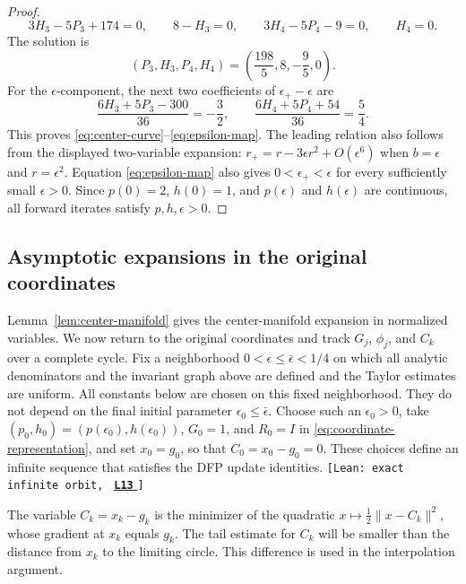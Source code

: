 \documentclass[11pt]{article}
\newcommand{\leanLinkText}[1]{%
  \underline{\textbf{#1}}%
}
\newcommand{\leanSnapshot}{e308927f5b7930bdd002f0c0e42b9d112ad821cb}
\newcommand{\leanClaimTag}[3]{%
  {\footnotesize\texttt{[Lean: #1, }}%
  \href{https://github.com/imathwy/DFP_wolfe_local/blob/\leanSnapshot/#2?plain=1\#L#3}%
    {\leanLinkText{\footnotesize\texttt{L#3}}}%
  {\footnotesize\texttt{]}}\enspace
}
\begin{document}
\begin{proof}
\begin{equation}
3H_3-5P_3+174=0,\qquad 8-H_3=0,\qquad
3H_4-5P_4-9=0,\qquad H_4=0.
\end{equation}
The solution is
\[
(P_3,H_3,P_4,H_4)=\left(\frac{198}{5},8,-\frac95,0\right).
\]
For the $\epsilon$-component, the next two coefficients of
$\epsilon_+-\epsilon$ are
\[
\frac{6H_3+5P_3-300}{36}=-\frac32,
\qquad
\frac{6H_4+5P_4+54}{36}=\frac54.
\]
This proves \eqref{eq:center-curve}--\eqref{eq:epsilon-map}.  The leading
relation also follows from the displayed two-variable expansion:
$r_+=r-3\epsilon r^2+O(\epsilon^6)$ when
$b=\epsilon$ and $r=\epsilon^2$.
Equation \eqref{eq:epsilon-map} also gives
$0<\epsilon_+<\epsilon$ for every sufficiently small $\epsilon>0$.
Since $p(0)=2$, $h(0)=1$, and $p(\epsilon)$ and $h(\epsilon)$ are continuous,
all forward iterates satisfy $p,h,\epsilon>0$.
\end{proof}

\subsection{Asymptotic expansions in the original coordinates}

Lemma~\ref{lem:center-manifold} gives the center-manifold expansion in
normalized variables.  We now return to the original coordinates and track
$G_j$, $\phi_j$, and $C_k$ over a complete cycle.  Fix a neighborhood
$0<\epsilon\le\bar\epsilon<1/4$ on which all analytic denominators and the
invariant graph above are defined and the Taylor estimates are uniform.  All
constants below are chosen on this fixed neighborhood.  They do not depend on
the final initial parameter
$\epsilon_0\le\bar\epsilon$.  Choose such an $\epsilon_0>0$, take
$(p_0,h_0)=(p(\epsilon_0),h(\epsilon_0))$, $G_0=1$, and $R_0=I$ in
\eqref{eq:coordinate-representation}, and set $x_0=g_0$, so that
$C_0=x_0-g_0=0$.
These choices define an infinite sequence that satisfies the DFP update
identities.
\leanClaimTag{exact infinite orbit}{DFPWolfe/A_uniformly_convex_counterexample_to_global_convergence_of_DFP_under_weak_Wolfe_/Definition_3_19b_Exact_infinite_abstract_two_phase_orbit.lean}{13}
The variable $C_k=x_k-g_k$ is the minimizer of the quadratic
$x\mapsto\frac12\|x-C_k\|^2$, whose gradient at $x_k$ equals $g_k$.
The tail estimate for $C_k$ will be smaller than the distance from $x_k$ to the
limiting circle.  This difference is used in the interpolation argument.
\end{document}
